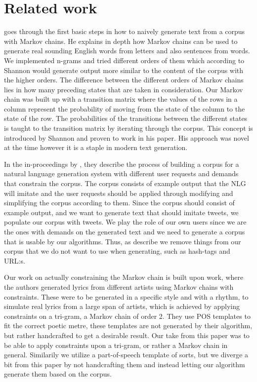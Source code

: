 \documentclass[a4paper,12pt]{article}
\begin{document}
\section{Related work}
\label{sec:relwork}
\cite{shannon48} goes through the first basic steps in how to naively generate text from a corpus with Markov chains. 
He explains in depth how Markov chains can be used to generate real sounding English words from letters and also sentences from words. 
We implemented n-grams and tried different orders of them which according to Shannon would generate output more similar to the content of the corpus with the higher orders. 
The difference between the different orders of Markov chains lies in how many preceding states that are taken in consideration.
Our Markov chain was built up with a transition matrix where the values of the rows in a column represent the probability of moving from the state of the column to the state of the row. The probabilities of the transitions between the different states is taught to the transition matrix by iterating through the corpus. This concept is introduced by Shannon and proven to work in his paper.
His approach was novel at the time however it is a staple in modern text generation. 


In the in-proceedings by \cite{Corpus}, they describe the process of building a corpus for a natural language generation system with different user requests and demands that constrain the corpus. 
The corpus consists of example output that the NLG will imitate and the user requests should be applied through modifying and simplifying the corpus according to them.
Since the corpus should consist of example output, and we want to generate text that should imitate tweets, we populate our corpus with tweets.
We play the role of our own users since we are the ones with demands on the generated text and we need to generate a corpus that is usable by our algorithms. Thus, as \citep{Corpus} describe we remove things from our corpus that we do not want to use when generating, such as hash-tags and URL:s.


Our work on actually constraining the Markov chain is built upon \cite{McBarb} work, 
where the authors generated lyrics from different artists using Markov chains with constraints. 
These were to be generated in a specific style and with a rhythm, to simulate real lyrics from a large span of artists, which is achieved by applying constraints on a tri-gram, a Markov chain of order 2.
They use POS templates to fit the correct poetic metre, these templates are not generated by their algorithm, but rather handcrafted to get a desirable result.
Our take from this paper was to be able to apply constraints upon a tri-gram, or rather a Markov chain in general. Similarily we utilize a part-of-speech template of sorts, but we diverge a bit from this paper by not handcrafting them and instead letting our algorithm generate them based on the corpus.
\end{document}
